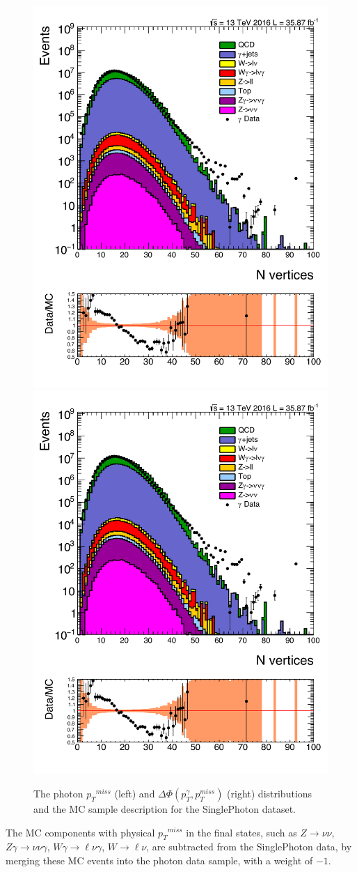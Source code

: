 \begin{figure}[htbp!]
\centering
\includegraphics[width=0.48\linewidth, page=7]{figures/ReMiniAODSummer16HLT_FixXsec_SepProc_PhPtWt_tight_puWeightsummer16_unblind_log_.pdf}
\includegraphics[width=0.48\linewidth, page=8]{figures/ReMiniAODSummer16HLT_FixXsec_SepProc_PhPtWt_tight_puWeightsummer16_unblind_log_.pdf}
\caption{The photon ${p_{T}}^{miss}$ (left) and $\Delta \Phi (p_T ^\gamma ,p_T ^{miss})$ (right) distributions and the MC sample description for the SinglePhoton dataset. }
\label{fig:pho_metpara}
\end{figure}

\vspace{0.3cm}
The MC components with physical ${p_{T}}^{miss}$ in the final states, such as $Z\rightarrow\nu\nu$, $Z\gamma\rightarrow\nu\nu\gamma$, $W\gamma\rightarrow\ell\nu\gamma$, $W\rightarrow\ell\nu$, are subtracted from the SinglePhoton data, by merging these MC events into the photon data sample, with a weight of $-1$.

